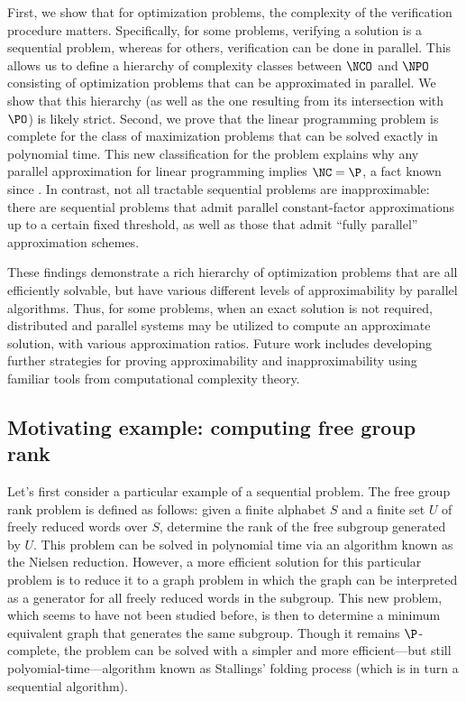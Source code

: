 \documentclass{article}
\begin{document}
%
%
%
First, we show that for optimization problems, the complexity of the verification procedure matters.
Specifically, for some problems, verifying a solution is a sequential problem, whereas for others, verification can be done in parallel.
This allows us to define a hierarchy of complexity classes between $\NCO$ and $\NPO$ consisting of optimization problems that can be approximated in parallel.
We show that this hierarchy (as well as the one resulting from its intersection with $\PO$) is likely strict.
Second, we prove that the linear programming problem is complete for the class of maximization problems that can be solved exactly in polynomial time.
This new classification for the problem explains why any parallel approximation for linear programming implies $\NC = \P$, a fact known since .
In contrast, not all tractable sequential problems are inapproximable: there are sequential problems that admit parallel constant-factor approximations up to a certain fixed threshold, as well as those that admit ``fully parallel'' approximation schemes.

%
%
These findings demonstrate a rich hierarchy of optimization problems that are all efficiently solvable, but have various different levels of approximability by parallel algorithms.
Thus, for some problems, when an exact solution is not required, distributed and parallel systems may be utilized to compute an approximate solution, with various approximation ratios.
%
%
Future work includes developing further strategies for proving approximability and inapproximability using familiar tools from computational complexity theory.

\subsection{Motivating example: computing free group rank}

Let's first consider a particular example of a sequential problem.
The free group rank problem is defined as follows: given a finite alphabet $S$ and a finite set $U$ of freely reduced words over $S$, determine the rank of the free subgroup generated by $U$.
This problem can be solved in polynomial time via an algorithm known as the Nielsen reduction.
However, a more efficient solution for this particular problem is to reduce it to a graph problem in which the graph can be interpreted as a generator for all freely reduced words in the subgroup.
This new problem, which seems to have not been studied before, is then to determine a minimum equivalent graph that generates the same subgroup.
Though it remains $\P$-complete, the problem can be solved with a simpler and more efficient---but still polyomial-time---algorithm known as Stallings' folding process (which is in turn a sequential algorithm).
\end{document}

